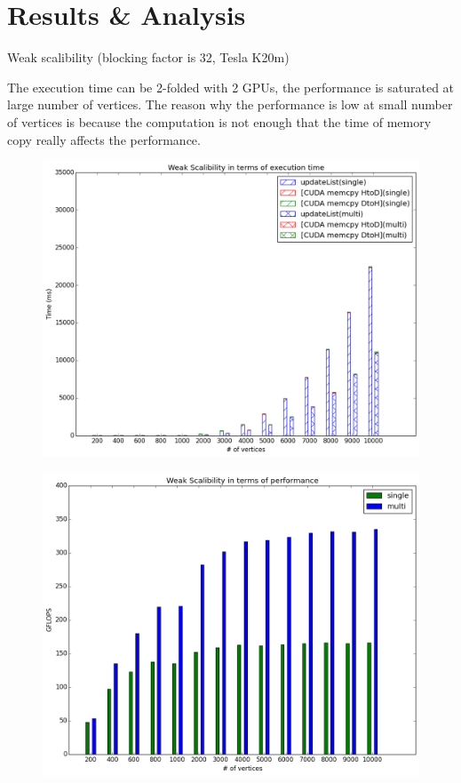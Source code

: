 \documentclass[12pt]{article}
\makeatletter
\renewenvironment{itemize}
{\list{$\bullet$}{\leftmargin\z@ \labelwidth\z@ \itemindent-\leftmargin
\let\makelabel\descriptionlabel}}
{\endlist}
\makeatother
\begin{document}
\section*{Results \& Analysis}
\vspace{-20pt}
\noindent\makebox[\linewidth]{\rule{\textwidth}{0.4pt}}

\begin{itemize}
    \item Weak scalibility (blocking factor is 32, Tesla K20m)
    \begin{flushleft}
        The execution time can be 2-folded with 2 GPUs, the performance is saturated at large number of vertices. The reason why the performance is low at small number of vertices is because the computation is not enough that the time of memory copy really affects the performance.
    \end{flushleft}
    \begin{figure}[ht]
        \includegraphics[scale=.5]{./weak-scalibility-time.png}
    \end{figure}
    \begin{figure}[ht]
        \vspace{-20pt}
        \includegraphics[scale=.5]{./weak-scalibility-perf.png}

\end{figure}
\end{itemize}
\end{document}
